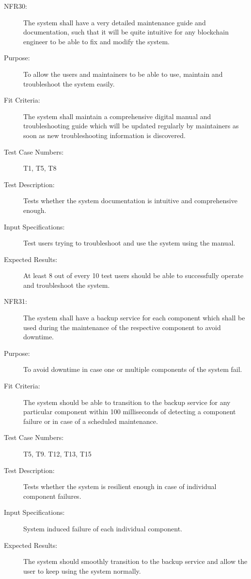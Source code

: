 \documentclass[a4paper,twoside,phd]{BYUPhys}
\begin{document}
\begin{description}
\item[NFR30:] The system shall have a very detailed maintenance guide and documentation, such that it will be quite intuitive for any blockchain engineer to be able to fix and modify the system.
\item[Purpose:] To allow the users and maintainers to be able to use, maintain and troubleshoot the system easily.
\item[Fit Criteria:] The system shall maintain a comprehensive digital manual and troubleshooting guide which will be updated regularly by maintainers as soon as new troubleshooting information is discovered.
\item[Test Case Numbers:] T1, T5, T8
\item[Test Description:] Tests whether the system documentation is intuitive and comprehensive enough.
\item[Input Specifications:] Test users trying to troubleshoot and use the system using the manual.
\item[Expected Results:] At least 8 out of every 10 test users should be able to successfully operate and troubleshoot the system.

\item[NFR31:] The system shall have a backup service for each component which shall be used during the maintenance of the respective component to avoid downtime.
\item[Purpose:] To avoid downtime in case one or multiple components of the system fail.
\item[Fit Criteria:] The system should be able to transition to the backup service for any particular component within 100 milliseconds of detecting a component failure or in case of a scheduled maintenance.
\item[Test Case Numbers:] T5, T9. T12, T13, T15
\item[Test Description:] Tests whether the system is resilient enough in case of individual component failures.
\item[Input Specifications:] System induced failure of each individual component.
\item[Expected Results:] The system should smoothly transition to the backup service and allow the user to keep using the system normally.
\end{description}
\end{document}
